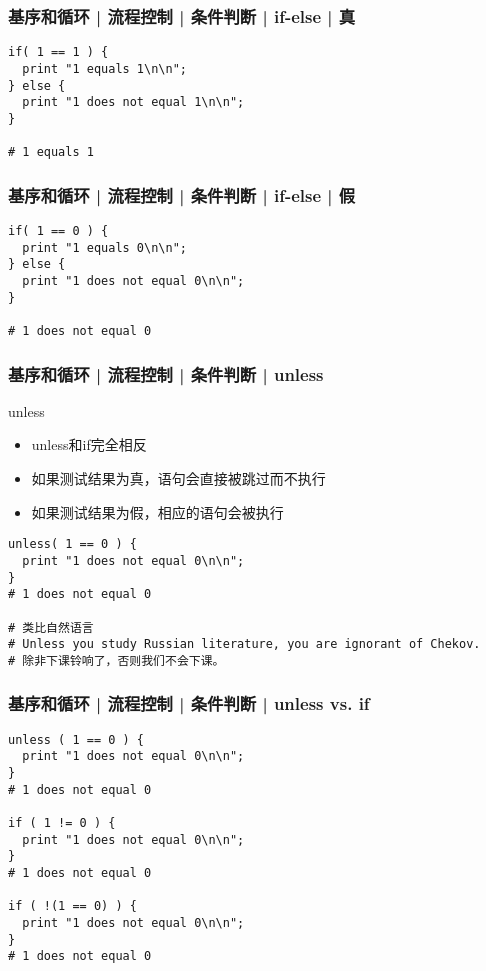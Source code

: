 \begin{frame}[fragile]
  \frametitle{基序和循环 | 流程控制 | 条件判断 | \alert{if-else} | 真}
\begin{lstlisting}
if( 1 == 1 ) {
  print "1 equals 1\n\n";
} else {
  print "1 does not equal 1\n\n";
}

# 1 equals 1
\end{lstlisting}
\end{frame}

\begin{frame}[fragile]
  \frametitle{基序和循环 | 流程控制 | 条件判断 | \alert{if-else} | 假}
\begin{lstlisting}
if( 1 == 0 ) {
  print "1 equals 0\n\n";
} else {
  print "1 does not equal 0\n\n";
}

# 1 does not equal 0
\end{lstlisting}
\end{frame}

\begin{frame}[fragile]
  \frametitle{基序和循环 | 流程控制 | 条件判断 | \alert{unless}}
  \begin{block}{unless}
    \begin{itemize}
      \item unless和if完全相反
      \item 如果测试结果为真，语句会直接被跳过而不执行
      \item 如果测试结果为假，相应的语句会被执行
    \end{itemize}
  \end{block}
  \pause
\begin{lstlisting}
unless( 1 == 0 ) {
  print "1 does not equal 0\n\n";
}
# 1 does not equal 0

# 类比自然语言
# Unless you study Russian literature, you are ignorant of Chekov.
# 除非下课铃响了，否则我们不会下课。
\end{lstlisting}
\end{frame}

\begin{frame}[fragile]
  \frametitle{基序和循环 | 流程控制 | 条件判断 | unless vs. if}
\begin{lstlisting}
unless ( 1 == 0 ) {
  print "1 does not equal 0\n\n";
}
# 1 does not equal 0

if ( 1 != 0 ) {
  print "1 does not equal 0\n\n";
}
# 1 does not equal 0

if ( !(1 == 0) ) {
  print "1 does not equal 0\n\n";
}
# 1 does not equal 0
\end{lstlisting}
\end{frame}

